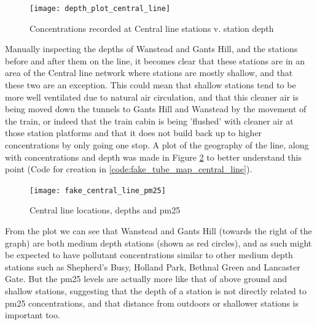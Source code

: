 \begin{figure}[H]
\centering
\texttt{[image: depth\_plot\_central\_line]}
\caption{Concentrations recorded at Central line stations v. station depth}
\label{fig:depth_plot_central_line}
\end{figure}

Manually inspecting the depths of Wanstead and Gants Hill, and the stations before and after them on the line, it becomes clear that these stations are in an area of the Central line network where stations are mostly shallow, and that these two are an exception. This could mean that shallow stations tend to be more well ventilated due to natural air circulation, and that this cleaner air is being moved down the tunnels to Gants Hill and Wanstead by the movement of the train, or indeed that the train cabin is being 'flushed' with cleaner air at those station platforms and that it does not build back up to higher concentrations by only going one stop. A plot of the geography of the line, along with concentrations and depth was made in Figure \ref{fig:fake_central_line_pm25} to better understand this point (Code for creation in \ref{code:fake_tube_map_central_line}).

\begin{figure}[H]
\centering
\texttt{[image: fake\_central\_line\_pm25]}
\caption{Central line locations, depths and \gls{pm25}}
\label{fig:fake_central_line_pm25}
\end{figure}

From the plot we can see that Wanstead and Gants Hill (towards the right of the graph) are both medium depth stations (shown as red circles), and as such might be expected to have pollutant concentrations similar to other medium depth stations such as Shepherd's Busy, Holland Park, Bethnal Green and Lancaster Gate. But the \gls{pm25} levels are actually more like that of above ground and shallow stations, suggesting that the depth of a station is not directly related to \gls{pm25} concentrations, and that distance from outdoors or shallower stations is important too.

